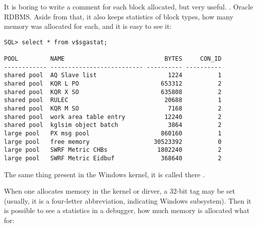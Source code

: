 {It is boring to write a comment for each block allocated, but very useful}.
.
 Oracle RDBMS.
{Aside from that, it also keeps statistics of block types,
how many memory was allocated for each, and it is easy to see it}:

\begin{lstlisting}
SQL> select * from v$sgastat;

POOL         NAME                            BYTES     CON_ID
------------ -------------------------- ---------- ----------
shared pool  AQ Slave list                    1224          1
shared pool  KQR L PO                       653312          2
shared pool  KQR X SO                       635808          2
shared pool  RULEC                           20688          1
shared pool  KQR M SO                         7168          2
shared pool  work area table entry           12240          2
shared pool  kglsim object batch              3864          2
large pool   PX msg pool                    860160          1
large pool   free memory                  30523392          0
large pool   SWRF Metric CHBs              1802240          2
large pool   SWRF Metric Eidbuf             368640          2
\end{lstlisting}

{The same thing present in the Windows kernel, it is called there} .

{When one allocates memory in the kernel or dirver, a 32-bit tag may be set (usually, it is a four-letter
abbreviation, indicating Windows subsystem)}.
{Then it is possible to see a statistics in a debugger, how much memory is allocated what for}:

